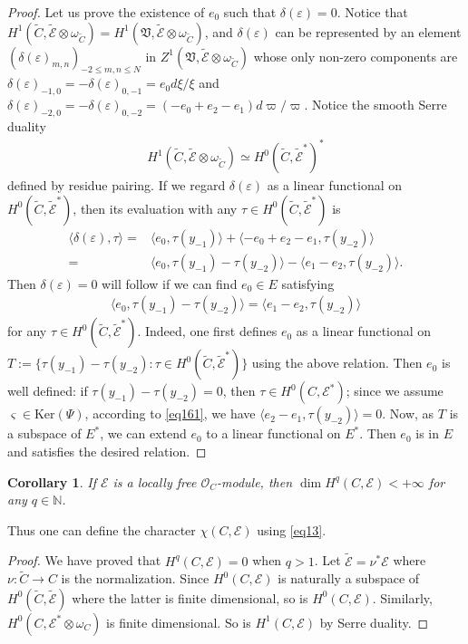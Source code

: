 \documentclass[12pt,a4paper,notitlepage]{report}
\theoremstyle{definition}
\theoremstyle{plain}
\newtheorem{co}[df]{Corollary}
\newcommand{\fk}{\mathfrak}
\newcommand{\wtd}{\widetilde}
\newcommand{\bk}[1]{\langle {#1}\rangle}
\newcommand{\scr}{\mathscr}
\newcommand{\sgm}{\varsigma}
\newcommand{\mbb}{\mathbb}
\newcommand{\Ker}{\mathrm{Ker}}
\numberwithin{equation}{section}
\begin{document}
\begin{proof}
Let us prove the existence of $e_0$ such that $\delta(\varepsilon)=0$. Notice that $H^1(\wtd C,\wtd{\scr E}\otimes\omega_{\wtd C})=H^1(\fk V,\wtd{\scr E}\otimes\omega_{\wtd C})$, and $\delta(\varepsilon)$ can be represented by an element  $(\delta(\varepsilon)_{m,n})_{-2\leq m,n\leq N}$ in $Z^1(\fk V,\wtd{\scr E}\otimes\omega_{\wtd C})$ whose only non-zero components are $\delta(\varepsilon)_{-1,0}=-\delta(\varepsilon)_{0,-1}=e_0d\xi/\xi$ and $\delta(\varepsilon)_{-2,0}=-\delta(\varepsilon)_{0,-2}=(-e_0+e_2-e_1)d\varpi/\varpi$. Notice the smooth Serre duality
\begin{align*}
H^1(\wtd C,\wtd{\scr E}\otimes\omega_{\wtd C})\simeq H^0(\wtd C,\wtd{\scr E}^*)^*
\end{align*}
defined by residue pairing. If we regard $\delta(\varepsilon)$ as a linear functional on $H^0(\wtd C,\wtd{\scr E}^*)$, then its evaluation with any $\tau\in H^0(\wtd C,\wtd{\scr E}^*)$ is
\begin{align*}
\bk{\delta(\varepsilon),\tau}=&\bk{e_0,\tau(y_{-1})}+\bk{-e_0+e_2-e_1,\tau(y_{-2})}\\
=&\bk{e_0,\tau(y_{-1})-\tau(y_{-2})}-\bk{e_1-e_2,\tau(y_{-2})}.
\end{align*}
Then $\delta(\varepsilon)=0$ will follow if we can find $e_0\in E$ satisfying
\begin{align*}
\bk{e_0,\tau(y_{-1})-\tau(y_{-2})}=\bk{e_1-e_2,\tau(y_{-2})}
\end{align*}
for any $\tau\in H^0(\wtd C,\wtd{\scr E}^*)$. Indeed, one first  defines $e_0$ as a linear functional on $T:=\{\tau(y_{-1})-\tau (y_{-2}):\tau\in H^0(\wtd C,\wtd {\scr E}^*)\}$ using the above relation. Then $e_0$ is well defined: if $\tau(y_{-1})-\tau(y_{-2})=0$, then $\tau\in H^0(C,\scr E^*)$; since we assume $\sgm\in\Ker(\Psi)$, according to \eqref{eq161}, we have $\bk{e_2-e_1,\tau(y_{-2})}=0$. Now, as $T$ is a subspace of $E^*$, we can extend $e_0$ to a linear functional on $E^*$. Then $e_0$ is in $E$ and satisfies the desired relation.
\end{proof}


\begin{co}
If $\scr E$ is a locally free $\scr O_C$-module, then $\dim H^q(C,\scr E)<+\infty$ for any $q\in\mbb N$.
\end{co}

Thus one can define the character $\chi(C,\scr E)$ using \eqref{eq13}.


\begin{proof}
We have proved that $H^q(C,\scr E)=0$ when $q>1$. Let $\wtd{\scr E}=\nu^*\scr E$ where $\nu:\wtd C\rightarrow C$ is the normalization. Since $H^0(C,\scr E)$ is naturally a subspace of $H^0(\wtd C,\wtd{\scr E})$ where the latter is finite dimensional, so is $H^0(C,\scr E)$. Similarly, $H^0(C,\scr E^*\otimes\omega_C)$ is finite dimensional. So is $H^1(C,\scr E)$ by Serre duality. 
\end{proof}
\end{document}
